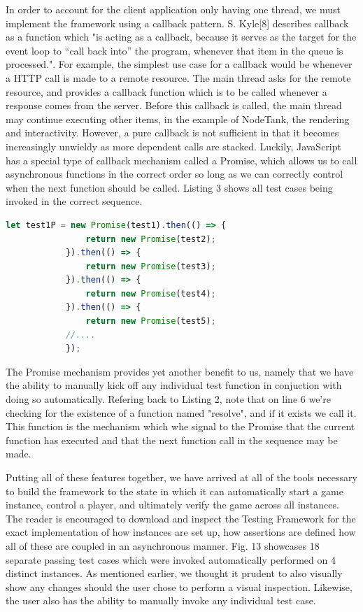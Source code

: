 \documentclass[conference]{IEEEtran}
\begin{document}
In order to account for the client application only having one thread, we must implement the framework using a callback pattern. S. Kyle[8] describes callback as a function which 
"is acting as a callback, because it serves as the target for the event loop to “call back into” the program, whenever that item in the queue is processed.". For example, the simplest 
use case for a callback would be whenever a HTTP call is made to a remote resource. The main thread asks for the remote resource, and provides a callback function which is to be called whenever
a response comes from the server. Before this callback is called, the main thread may continue executing other items, in the example of NodeTank, the rendering and interactivity. However, a pure
callback is not sufficient in that it becomes increasingly unwieldy as more dependent calls are stacked. Luckily, JavaScript has a special type of callback mechanism called a Promise, which allows 
us to call asynchronous functions in the correct order so long as we can correctly control when the next function should be called.  Listing 3 shows all test cases being invoked in the correct sequence.

\begin{lstlisting}[language=JavaScript,caption={Snippet of Automatically Invoking Test Cases in Order}]
    let test1P = new Promise(test1).then(() => {
                return new Promise(test2);
            }).then(() => {
                return new Promise(test3);
            }).then(() => {
                return new Promise(test4);
            }).then(() => {
                return new Promise(test5);
			//....
			});
\end{lstlisting}

The Promise mechanism provides yet another benefit to us, namely that we have the ability to manually kick off any individual test function in conjuction with doing so automatically. 
Refering back to Listing 2, note that on line 6 we're checking for the existence of a function named "resolve", and if it exists we call it. This function is the mechanism which whe signal 
to the Promise that the current function has executed and that the next function call in the sequence may be made. 

Putting all of these features together, we have arrived at all of the tools necessary to build the framework to the state in which it can automatically start a game instance, control a player, 
and ultimately verify the game across all instances. The reader is encouraged to download and inspect the Testing Framework for the exact implementation of how instances are set up,
how assertions are defined how all of these are coupled in an asynchronous manner. Fig. 13 showcases 18 separate passing test cases which were invoked automatically performed on 4 distinct instances.
As mentioned earlier, we thought it prudent to also visually show any changes should the user chose to perform a visual inspection. Likewise, the user also has the ability to manually invoke
any individual test case. 
\end{document}
